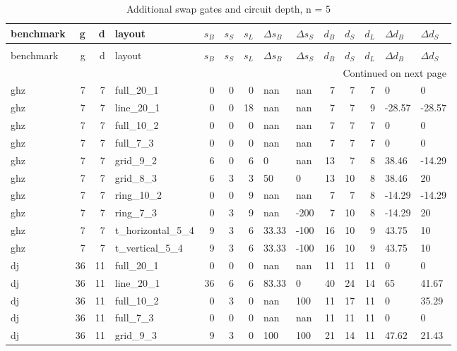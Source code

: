 \begin{longtable}{lrrlrrrllrrrll}
\caption{Additional swap gates and circuit depth, n = 5} \label{benchmark-table-5} \\
\toprule
benchmark & g & d & layout & $s_B$ & $s_S$ & $s_L$ & $\Delta s_B$ & $\Delta s_S$ & $d_B$ & $d_S$ & $d_L$ & $\Delta d_B$ & $\Delta d_S$ \\
\midrule
\endfirsthead
\caption[]{Additional swap gates and circuit depth, n = 5} \\
\toprule
benchmark & g & d & layout & $s_B$ & $s_S$ & $s_L$ & $\Delta s_B$ & $\Delta s_S$ & $d_B$ & $d_S$ & $d_L$ & $\Delta d_B$ & $\Delta d_S$ \\
\midrule
\endhead
\midrule
\multicolumn{14}{r}{Continued on next page} \\
\midrule
\endfoot
\bottomrule
\endlastfoot
ghz & 7 & 7 & full\_20\_1 & 0 & 0 & 0 & nan & nan & 7 & 7 & 7 & 0 & 0 \\
ghz & 7 & 7 & line\_20\_1 & 0 & 0 & 18 & nan & nan & 7 & 7 & 9 & -28.57 & -28.57 \\
ghz & 7 & 7 & full\_10\_2 & 0 & 0 & 0 & nan & nan & 7 & 7 & 7 & 0 & 0 \\
ghz & 7 & 7 & full\_7\_3 & 0 & 0 & 0 & nan & nan & 7 & 7 & 7 & 0 & 0 \\
ghz & 7 & 7 & grid\_9\_2 & 6 & 0 & 6 & 0 & nan & 13 & 7 & 8 & 38.46 & -14.29 \\
ghz & 7 & 7 & grid\_8\_3 & 6 & 3 & 3 & 50 & 0 & 13 & 10 & 8 & 38.46 & 20 \\
ghz & 7 & 7 & ring\_10\_2 & 0 & 0 & 9 & nan & nan & 7 & 7 & 8 & -14.29 & -14.29 \\
ghz & 7 & 7 & ring\_7\_3 & 0 & 3 & 9 & nan & -200 & 7 & 10 & 8 & -14.29 & 20 \\
ghz & 7 & 7 & t\_horizontal\_5\_4 & 9 & 3 & 6 & 33.33 & -100 & 16 & 10 & 9 & 43.75 & 10 \\
ghz & 7 & 7 & t\_vertical\_5\_4 & 9 & 3 & 6 & 33.33 & -100 & 16 & 10 & 9 & 43.75 & 10 \\
dj & 36 & 11 & full\_20\_1 & 0 & 0 & 0 & nan & nan & 11 & 11 & 11 & 0 & 0 \\
dj & 36 & 11 & line\_20\_1 & 36 & 6 & 6 & 83.33 & 0 & 40 & 24 & 14 & 65 & 41.67 \\
dj & 36 & 11 & full\_10\_2 & 0 & 3 & 0 & nan & 100 & 11 & 17 & 11 & 0 & 35.29 \\
dj & 36 & 11 & full\_7\_3 & 0 & 0 & 0 & nan & nan & 11 & 11 & 11 & 0 & 0 \\
dj & 36 & 11 & grid\_9\_3 & 9 & 3 & 0 & 100 & 100 & 21 & 14 & 11 & 47.62 & 21.43 \\

\end{longtable}
